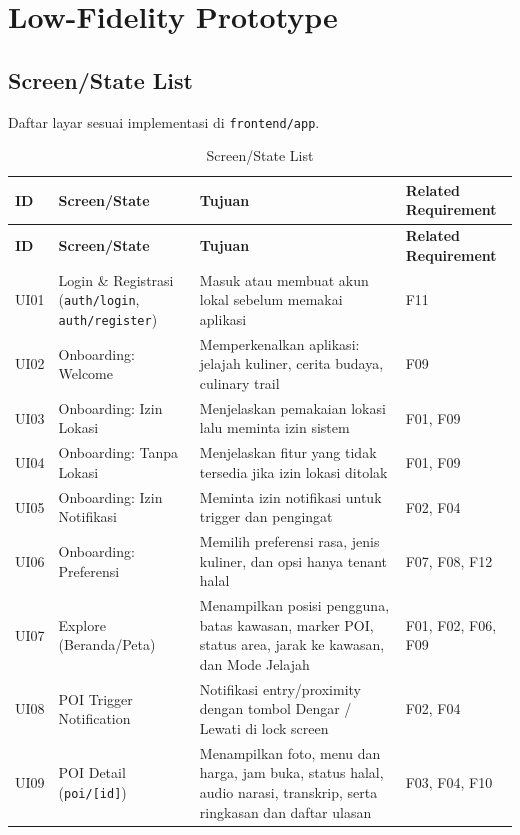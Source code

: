 \chapter{Low-Fidelity Prototype}
\label{bab:low-fidelity-prototype}
\section{Screen/State List}

Daftar layar sesuai implementasi di \texttt{frontend/app}.

\begin{longtable}{|L{0.092}|L{0.184}|L{0.507}|L{0.217}|}
\caption{Screen/State List}\\
\hline
{}\textbf{ID} & \textbf{Screen/State} & \textbf{Tujuan} & \textbf{Related Requirement} \\ \hline
\endfirsthead
\hline
{}\textbf{ID} & \textbf{Screen/State} & \textbf{Tujuan} & \textbf{Related Requirement} \\ \hline
\endhead
UI01 & Login \& Registrasi (\texttt{auth/login}, \texttt{auth/register}) & Masuk atau membuat akun lokal sebelum memakai aplikasi & F11 \\ \hline
UI02 & Onboarding: Welcome & Memperkenalkan aplikasi: jelajah kuliner, cerita budaya, culinary trail & F09 \\ \hline
UI03 & Onboarding: Izin Lokasi & Menjelaskan pemakaian lokasi lalu meminta izin sistem & F01, F09 \\ \hline
UI04 & Onboarding: Tanpa Lokasi & Menjelaskan fitur yang tidak tersedia jika izin lokasi ditolak & F01, F09 \\ \hline
UI05 & Onboarding: Izin Notifikasi & Meminta izin notifikasi untuk trigger dan pengingat & F02, F04 \\ \hline
UI06 & Onboarding: Preferensi & Memilih preferensi rasa, jenis kuliner, dan opsi hanya tenant halal & F07, F08, F12 \\ \hline
UI07 & Explore (Beranda/Peta) & Menampilkan posisi pengguna, batas kawasan, marker POI, status area, jarak ke kawasan, dan Mode Jelajah & F01, F02, F06, F09 \\ \hline
UI08 & POI Trigger Notification & Notifikasi entry/proximity dengan tombol Dengar / Lewati di lock screen & F02, F04 \\ \hline
UI09 & POI Detail (\texttt{poi/[id]}) & Menampilkan foto, menu dan harga, jam buka, status halal, audio narasi, transkrip, serta ringkasan dan daftar ulasan & F03, F04, F10 \\ \hline

\end{longtable}
